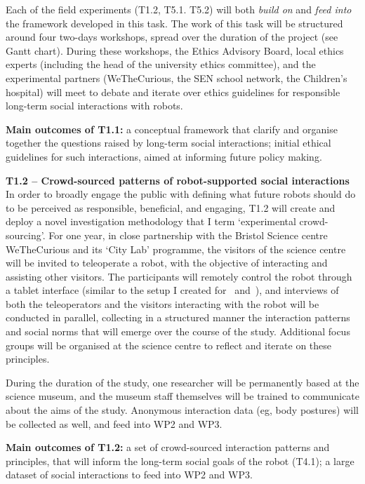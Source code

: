 Each of the field experiments (T1.2, T5.1. T5.2) will both \emph{build on} and
\emph{feed into} the framework developed in this task. The work of this task
will be structured around four two-days workshops, spread over the
duration of the project (see Gantt chart). During these workshops, the \project Ethics
Advisory Board, local ethics experts (including the head of the university
ethics committee), and the \project experimental partners (WeTheCurious, the SEN
school network, the Children's hospital) will meet to debate and iterate over
ethics guidelines for responsible long-term social interactions with robots.

\begin{framed}
    {\noindent\bf Main outcomes of T1.1:} a conceptual framework that clarify and
    organise together the questions raised by long-term social interactions;
    initial ethical guidelines for such interactions, aimed at informing future
    policy making.
\end{framed}


\textbf{T1.2 -- Crowd-sourced patterns of robot-supported social
interactions} In order to broadly engage the public with defining what future
robots should do to be perceived as responsible, beneficial, and engaging, T1.2
will create and deploy a novel investigation methodology that I term `experimental
crowd-sourcing'. For one year, in close partnership with the Bristol Science
centre WeTheCurious and its `City Lab' programme, the visitors of the science
centre will be invited to teleoperate a \project robot, with the objective of
interacting and assisting other visitors. The participants will remotely control the
robot through a tablet interface (similar to the setup I created
for~\cite{senft2019teaching} and~\cite{winkle2020couch}), and interviews of both the
teleoperators and the visitors interacting with the robot will be conducted in
parallel, collecting in a structured manner the interaction patterns and social
norms that will emerge over the course of the study. Additional focus groups
will be organised at the science centre to reflect and iterate on these
principles.

During the duration of the study, one researcher will be permanently based at
the science museum, and the museum staff themselves will be trained to
communicate about the aims of the study. Anonymous interaction data (eg, body
postures) will be collected as well, and feed into WP2 and WP3.

\begin{framed}
    {\noindent\bf Main outcomes of T1.2:} a set of crowd-sourced interaction
    patterns and principles, that will inform the long-term social goals of the
    robot (T4.1); a large dataset of social interactions to feed into WP2 and
    WP3.
\end{framed}

